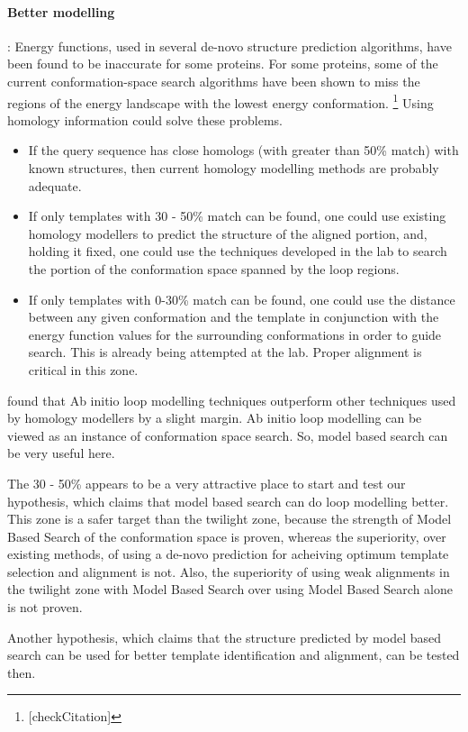 \documentclass[10pt]{report}
\begin{document}
\paragraph{Better modelling}: Energy functions, used in several de-novo structure prediction algorithms, have been found to be inaccurate for some proteins. For some proteins, some of the current conformation-space search algorithms have been shown to miss the regions of the energy landscape with the lowest energy conformation. \footnote{[checkCitation]} Using homology information could solve these problems.

\begin{itemize}
 \item If the query sequence has close homologs (with greater than 50\% match) with known structures, then current homology modelling methods are probably adequate.
 \item If only templates with 30 - 50\% match can be found, one could use existing homology modellers to predict the structure of the aligned portion, and, holding it fixed, one could use the techniques developed in the lab to search the portion of the conformation space spanned by the loop regions.
 \item If only templates with 0-30\% match can be found, one could use the distance between any given conformation and the template in conjunction with the energy function values for the surrounding conformations in order to guide search. This is already being attempted at the lab. Proper alignment is critical in this zone.
\end{itemize}

\cite{dalton07} found that Ab initio loop modelling techniques outperform other techniques used by homology modellers by a slight margin. Ab initio loop modelling can be viewed as an instance of conformation space search. So, model based search can be very useful here.

The 30 - 50\% appears to be a very attractive place to start and test our hypothesis, which claims that model based search can do loop modelling better. This zone is a safer target than the twilight zone, because the strength of Model Based Search of the conformation space is proven, whereas the superiority, over existing methods, of using a de-novo prediction for acheiving optimum template selection and alignment is not. Also, the superiority of using weak alignments in the twilight zone with Model Based Search over using Model Based Search alone is not proven.

Another hypothesis, which claims that the structure predicted by model based search can be used for better template identification and alignment, can be tested then.
\end{document}
